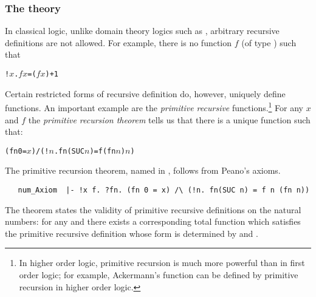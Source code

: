 \subsubsection{The theory }\label{prim_rec}

In classical logic, unlike domain theory logics such as \PPL{},
arbitrary recursive definitions are not allowed. For example, there is no
function $f$ (of type ) such that

\begin{alltt}
   !\(x\). \(f\) \(x\) = (\(f\) \(x\)) + 1
\end{alltt}
Certain restricted forms of recursive
%
%
definition do, however, uniquely define functions. An important
example are the \emph{primitive recursive} functions.\footnote{In
  higher order logic, primitive recursion is much more powerful than
  in first order logic; for example, Ackermann's function can be
  defined by primitive recursion in higher order logic.} For any $x$
and $f$ the \emph{primitive recursion theorem} tells us that there is
a unique function  such that:

\begin{alltt}
   (fn 0 = \(x\)) /\bs (!\(n\). fn(SUC \(n\)) = f (fn \(n\)) \(n\))
\end{alltt}

The primitive recursion theorem, named  in \HOL,
follows from Peano's
%
%
axioms.

\begin{hol}
\begin{verbatim}
   num_Axiom  |- !x f. ?fn. (fn 0 = x) /\ (!n. fn(SUC n) = f n (fn n))
\end{verbatim}
\end{hol}

\noindent The theorem states the validity of primitive recursive
definitions on the natural numbers: for any  and  there exists a
corresponding total function  which satisfies
the primitive recursive definition whose form is determined by  and
.

